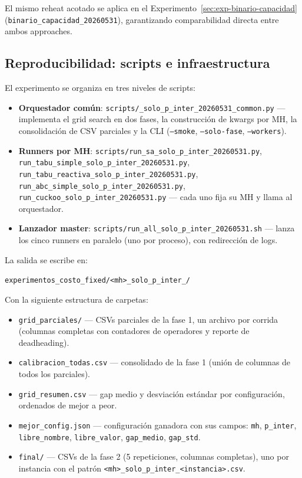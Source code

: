El mismo reheat acotado se aplica en el Experimento~\ref{sec:exp-binario-capacidad}
(\texttt{binario\_capacidad\_20260531}), garantizando comparabilidad
directa entre ambos approaches.

\subsection{Reproducibilidad: scripts e infraestructura}

El experimento se organiza en tres niveles de scripts:

\begin{itemize}
\item \textbf{Orquestador común}:
  \texttt{scripts/\_solo\_p\_inter\_20260531\_common.py} --- implementa
  el grid search en dos fases, la construcción de kwargs por MH, la
  consolidación de CSV parciales y la CLI (\texttt{--smoke},
  \texttt{--solo-fase}, \texttt{--workers}).
\item \textbf{Runners por MH}:
  \texttt{scripts/run\_sa\_solo\_p\_inter\_20260531.py},
  \texttt{run\_tabu\_simple\_solo\_p\_inter\_20260531.py},
  \texttt{run\_tabu\_reactiva\_solo\_p\_inter\_20260531.py},
  \texttt{run\_abc\_simple\_solo\_p\_inter\_20260531.py},
  \texttt{run\_cuckoo\_solo\_p\_inter\_20260531.py} ---
  cada uno fija su MH y llama al orquestador.
\item \textbf{Lanzador master}:
  \texttt{scripts/run\_all\_solo\_p\_inter\_20260531.sh} --- lanza
  los cinco runners en paralelo (uno por proceso), con redirección de
  logs.
\end{itemize}

La salida se escribe en:
\begin{center}
\texttt{experimentos\_costo\_fixed/<mh>\_solo\_p\_inter\_<YYYYMMDD-HHMM>/}
\end{center}

Con la siguiente estructura de carpetas:

\begin{itemize}
\item \texttt{grid\_parciales/} --- CSVs parciales de la fase 1, un
  archivo por corrida (columnas completas con contadores de operadores
  y reporte de deadheading).
\item \texttt{calibracion\_todas.csv} --- consolidado de la fase 1
  (unión de columnas de todos los parciales).
\item \texttt{grid\_resumen.csv} --- gap medio y desviación estándar
  por configuración, ordenados de mejor a peor.
\item \texttt{mejor\_config.json} --- configuración ganadora con sus
  campos: \texttt{mh}, \texttt{p\_inter}, \texttt{libre\_nombre},
  \texttt{libre\_valor}, \texttt{gap\_medio}, \texttt{gap\_std}.
\item \texttt{final/} --- CSVs de la fase 2 (5 repeticiones, columnas
  completas), uno por instancia con el patrón
  \texttt{<mh>\_solo\_p\_inter\_<instancia>.csv}.
\end{itemize}

